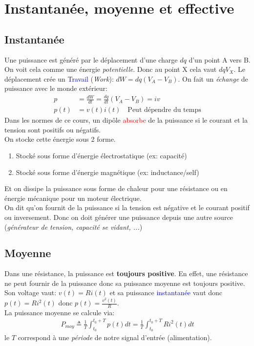\documentclass{report}
\begin{document}
\section{Instantanée, moyenne et effective}

\subsection{Instantanée}
Une puissance est généré par le déplacement d'une charge $dq$ d'un point A vers B. On voit cela comme une énergie \textit{potentielle}. Donc au point X cela vaut $dq V_X$. Le déplacement crée un \textcolor{blue}{Travail} (\textit{Work}): $dW = dq (V_A - V_B)$. On fait un \textit{échange} de puissance avec le monde extérieur:
\begin{align*}
p &= \frac{dW}{dt} = \frac{dq}{dt}(V_A - V_B) = iv\\
p(t) &= v(t) i(t) \quad \text{Peut dépendre du temps}
\end{align*}
Dans les normes de ce cours, un dipôle \textcolor{red}{absorbe} de la puissance si le courant et la tension sont positifs ou négatifs.\\
On stocke cette énergie sous 2 forme.
\begin{enumerate}
\item Stocké sous forme d'énergie électrostatique (ex: capacité)
\item Stocké sous forme d'énergie magnétique (ex: inductance/self)
\end{enumerate}
Et on dissipe la puissance sous forme de chaleur pour une résistance ou en énergie mécanique pour un moteur électrique.\\

On dit qu'on fournit de la puissance si la tension est négative et le courant positif ou inversement. Donc on doit générer une puissance depuis une autre source (\textit{générateur de tension, capacité se vidant, ...})

\subsection{Moyenne}
Dans une résistance, la puissance est \textbf{toujours positive}. En effet, une résistance ne peut fournir de la puissance donc sa puissance moyenne est toujours positive.\\
Son voltage vaut: $v(t) = R i(t)$ et sa puissance \textcolor{blue}{instantanée} vaut donc $p(t) = R i^2(t)$ donc $p(t) = \frac{v^2(t)}{R}$.\\
La puissance moyenne se calcule via:
\begin{align*}
P_{moy} \triangleq \frac{1}{T} \int_{t_0}^{t_0 + T} p(t) dt = \frac{1}{T}\int_{t_0}^{t_0 + T} R i^2 (t) dt
\end{align*}
le $T$ correspond à une \textit{période} de notre signal d'entrée (alimentation).
\end{document}
